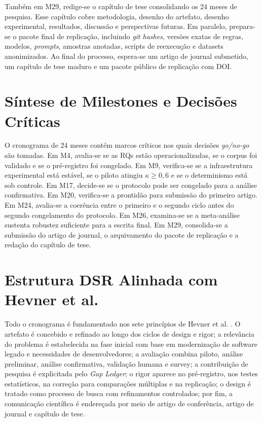 \documentclass[12pt,a4paper]{article}
\begin{document}
Também em M29, redige-se o capítulo de tese consolidando os 24 meses de pesquisa. Esse capítulo cobre metodologia, desenho do artefato, desenho experimental, resultados, discussão e perspectivas futuras. Em paralelo, prepara-se o pacote final de replicação, incluindo \textit{git hashes}, versões exatas de regras, modelos, \textit{prompts}, amostras anotadas, scripts de reexecução e datasets anonimizados. Ao final do processo, espera-se um artigo de journal submetido, um capítulo de tese maduro e um pacote público de replicação com DOI.

\section*{Síntese de Milestones e Decisões Críticas}

O cronograma de 24 meses contém marcos críticos nos quais decisões \textit{go/no-go} são tomadas. Em M4, avalia-se se as RQs estão operacionalizadas, se o corpus foi validado e se o pré-registro foi congelado. Em M9, verifica-se se a infraestrutura experimental está estável, se o piloto atingiu $\kappa \geq 0{,}6$ e se o determinismo está sob controle. Em M17, decide-se se o protocolo pode ser congelado para a análise confirmativa. Em M20, verifica-se a prontidão para submissão do primeiro artigo. Em M24, avalia-se a coerência entre o primeiro e o segundo ciclo antes do segundo congelamento do protocolo. Em M26, examina-se se a meta-análise sustenta robustez suficiente para a escrita final. Em M29, consolida-se a submissão do artigo de journal, o arquivamento do pacote de replicação e a redação do capítulo de tese.

\section*{Estrutura DSR Alinhada com Hevner et al.}

Todo o cronograma é fundamentado nos sete princípios de Hevner et al. \cite{hevner2004}. O artefato é concebido e refinado ao longo dos ciclos de design e rigor; a relevância do problema é estabelecida na fase inicial com base em modernização de software legado e necessidades de desenvolvedores; a avaliação combina piloto, análise preliminar, análise confirmativa, validação humana e survey; a contribuição de pesquisa é explicitada pelo \textit{Gap Ledger}; o rigor aparece no pré-registro, nos testes estatísticos, na correção para comparações múltiplas e na replicação; o design é tratado como processo de busca com refinamentos controlados; por fim, a comunicação científica é endereçada por meio de artigo de conferência, artigo de journal e capítulo de tese.
\end{document}
